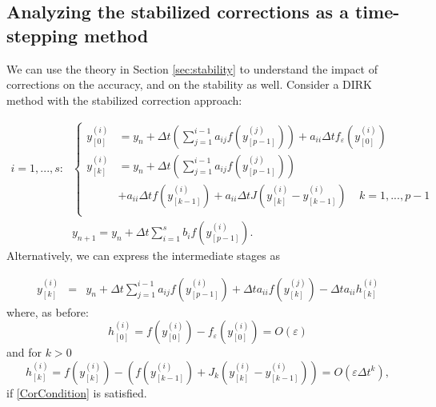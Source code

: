 \documentclass{siamart251104}
\newcommand{\dt}{\Delta t}
\begin{document}
\subsection{Analyzing the stabilized corrections as 
a time-stepping method}
We can use the theory in Section \ref{sec:stability} 
to understand the impact of corrections on the accuracy, and on the stability as well.
Consider a DIRK method with the stabilized correction approach:


\begin{align} \label{MPDIRKimpC}
\mbox{$i=1, . . ., s$:} 
& \left\{\begin{aligned} 
 y^{(i)}_{[0]} & =  y_n + 
    \dt \left( \sum_{j=1}^{i-1} a_{ij} f(y^{(j)}_{[p-1]}) \right) 
     + a_{ii} \dt f_{\varepsilon}(y^{(i)}_{[0]}) 
\nonumber \\
 y^{(i)}_{[k]} & =  y_n + 
    \dt \left( \sum_{j=1}^{i-1} a_{ij} f(y^{(j)}_{[p-1]})\right)  \\
    & + a_{ii} \dt f(y^{(i)}_{[k-1]})  
    + a_{ii} \dt J \left(y^{(i)}_{[k]} - y^{(i)}_{[k-1]} \right)
    \; \; \; \; k=1, . . ., p-1 \nonumber\\
    \end{aligned} \right. \nonumber \\
& y_{n+1}  =  y_n + \dt \sum_{i=1}^s b_{i} f(y^{(i)}_{[p-1]}) .
\end{align}
Alternatively, we can express the intermediate stages as 

\begin{eqnarray} \label{MPDIRKimpC2}
y^{(i)}_{[k]} & = & y_n + \dt  \sum_{j=1}^{i-1} a_{ij} 
f(y^{(i)}_{[p-1]}) +
\dt a_{ii} f(y^{(j)}_{[k]})   - \dt a_{ii}  h_{[k]}^{(i)}
\end{eqnarray}
where, as before:
\[  h_{[0]}^{(i)}  =  f(y^{(i)}_{[0]}) -f_\varepsilon(y^{(i)}_{[0]})    = O(\varepsilon) \]
and for $k>0$
\[  h_{[k]}^{(i)}  =  f(y^{(i)}_{[k]}) - \left(  f(y^{(i)}_{[k-1]}) + J_k \left(y^{(i)}_{[k]} - y^{(i)}_{[k-1]}\right)  \right) = O(\varepsilon \dt^{k}),\]
if \eqref{CorCondition} is satisfied.


\end{document}
